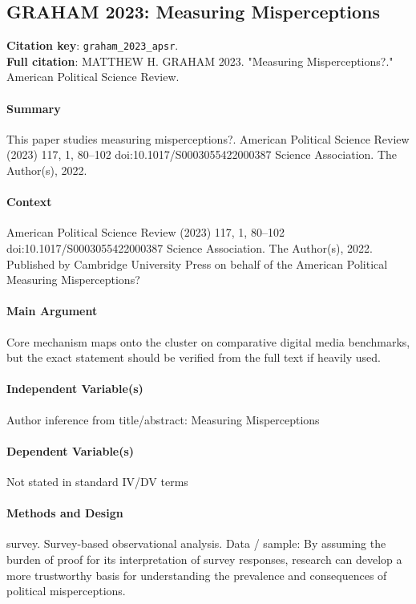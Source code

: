 \documentclass[12pt]{article}
\begin{document}
\subsection{GRAHAM 2023: Measuring Misperceptions}
\textbf{Citation key}: \texttt{graham\_2023\_apsr}.\\
\textbf{Full citation}: MATTHEW H. GRAHAM 2023. "Measuring Misperceptions?." American Political Science Review.

\paragraph{Summary} This paper studies measuring misperceptions?. American Political Science Review (2023) 117, 1, 80--102 doi:10.1017/S0003055422000387 Science Association.  The Author(s), 2022.

\paragraph{Context} American Political Science Review (2023) 117, 1, 80--102 doi:10.1017/S0003055422000387 Science Association.  The Author(s), 2022. Published by Cambridge University Press on behalf of the American Political Measuring Misperceptions?

\paragraph{Main Argument} Core mechanism maps onto the cluster on comparative digital media benchmarks, but the exact statement should be verified from the full text if heavily used.

\paragraph{Independent Variable(s)} Author inference from title/abstract: Measuring Misperceptions

\paragraph{Dependent Variable(s)} Not stated in standard IV/DV terms

\paragraph{Methods and Design} survey. Survey-based observational analysis. Data / sample: By assuming the burden of proof for its interpretation of survey responses, research can develop a more trustworthy basis for understanding the prevalence and consequences of political misperceptions.
\end{document}
